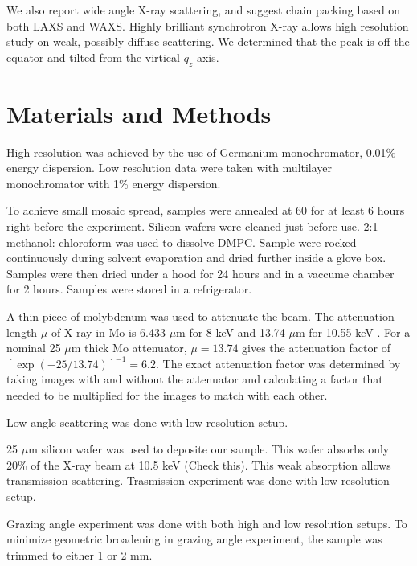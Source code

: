 We also report wide
angle X-ray scattering, and suggest chain packing based on both LAXS and WAXS.
Highly brilliant synchrotron X-ray allows high resolution study on 
weak, possibly diffuse scattering.  We determined that the peak is off the 
equator and tilted from the virtical $q_z$ axis.

\section{Materials and Methods}
High resolution was achieved by the use of Germanium monochromator, 0.01\% 
energy dispersion. Low resolution data were taken with multilayer 
monochromator with 1\% energy dispersion.

To achieve small mosaic spread, samples were annealed at 60 \textcelsius for
at least 6 hours right before the experiment. Silicon wafers were cleaned
just before use. 2:1 methanol: chloroform was used to dissolve DMPC.
Sample were rocked continuously during solvent evaporation and dried further
inside a glove box. Samples were then dried under a hood for 24 hours 
and in a vaccume chamber for 2 hours. Samples were stored in a refrigerator.

A thin piece of molybdenum was used to attenuate the beam. The attenuation length
$\mu$ of X-ray in Mo is 6.433 $\mu$m for 8 keV and 13.74 $\mu$m for 10.55 keV 
\cite{ref:cxro}.
For a nominal 25 $\mu$m thick Mo attenuator, $\mu=13.74$ gives the attenuation factor 
of $[\exp(-25/13.74)]^{-1} = 6.2$. The exact attenuation factor was determined
by taking images with and without the attenuator and calculating a factor
that needed to be multiplied for the images to match with each other.

Low angle scattering was done with low resolution setup.

25 $\mu$m silicon wafer was used to deposite our sample. This wafer absorbs
only 20\% of the X-ray beam at 10.5 keV (Check this). This weak absorption
allows transmission scattering. Trasmission experiment was done with
low resolution setup.

Grazing angle experiment was done with both high and low resolution setups.
To minimize geometric broadening in grazing angle experiment, the sample
was trimmed to either 1 or 2 mm. 

